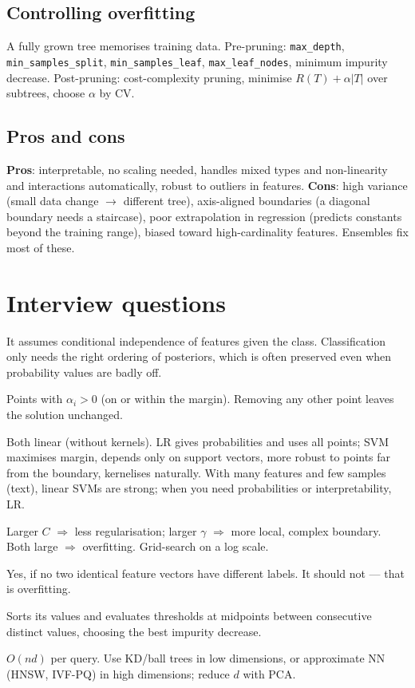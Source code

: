 \subsection{Controlling overfitting}
A fully grown tree memorises training data. Pre-pruning: \texttt{max\_depth}, \texttt{min\_samples\_split}, \texttt{min\_samples\_leaf}, \texttt{max\_leaf\_nodes}, minimum impurity decrease. Post-pruning: cost-complexity pruning, minimise $R(T)+\alpha|T|$ over subtrees, choose $\alpha$ by CV.

\subsection{Pros and cons}
\textbf{Pros}: interpretable, no scaling needed, handles mixed types and non-linearity and interactions automatically, robust to outliers in features. \textbf{Cons}: high variance (small data change $\to$ different tree), axis-aligned boundaries (a diagonal boundary needs a staircase), poor extrapolation in regression (predicts constants beyond the training range), biased toward high-cardinality features. Ensembles fix most of these.

\section{Interview questions}
\A It assumes conditional independence of features given the class. Classification only needs the right ordering of posteriors, which is often preserved even when probability values are badly off.

\A Points with $\alpha_i>0$ (on or within the margin). Removing any other point leaves the solution unchanged.

\A Both linear (without kernels). LR gives probabilities and uses all points; SVM maximises margin, depends only on support vectors, more robust to points far from the boundary, kernelises naturally. With many features and few samples (text), linear SVMs are strong; when you need probabilities or interpretability, LR.

\A Larger $C$ $\Rightarrow$ less regularisation; larger $\gamma$ $\Rightarrow$ more local, complex boundary. Both large $\Rightarrow$ overfitting. Grid-search on a log scale.

\A Yes, if no two identical feature vectors have different labels. It should not --- that is overfitting.

\A Sorts its values and evaluates thresholds at midpoints between consecutive distinct values, choosing the best impurity decrease.

\A $O(nd)$ per query. Use KD/ball trees in low dimensions, or approximate NN (HNSW, IVF-PQ) in high dimensions; reduce $d$ with PCA.
